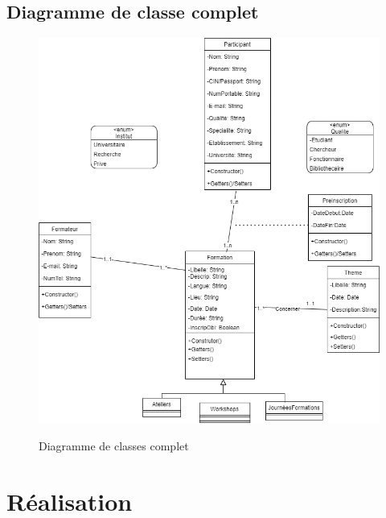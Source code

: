 \subsection{Diagramme de classe complet}
 \begin{figure}[!h]
	\centering
	{\includegraphics[width=1\textwidth]{D) IMAGES/diagClasseGlobal.png}}
	\caption{Diagramme de classes complet}
	\label{Diagramme3}
\end{figure}
\newpage
\section{Réalisation}
